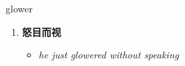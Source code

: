 
\begin{frame}
{\huge glower}
\begin{center}
\begin{enumerate}\Large
  \item \textbf{怒目而视}
  \begin{itemize}
    \item \em{\Large{he just glowered without speaking}}
  \end{itemize}
\end{enumerate}
\end{center}
\end{frame}
